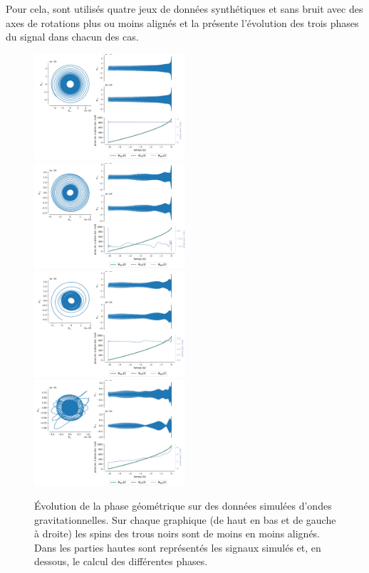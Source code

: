 Pour cela, sont utilisés quatre jeux de données synthétiques et sans bruit avec des axes de rotations plus ou moins alignés et la  présente l’évolution des trois phases du signal dans chacun des cas.
\\
\begin{figure}[h]
	\includegraphics[width=0.5\textwidth]{fig/part-3/GW_plot_1.pdf}\hfill
	\includegraphics[width=0.5\textwidth]{fig/part-3/GW_plot_2.pdf}\\
	\includegraphics[width=0.5\textwidth]{fig/part-3/GW_plot_3.pdf}\hfill
	\includegraphics[width=0.5\textwidth]{fig/part-3/GW_plot_4.pdf}
	\caption[Évolution de la phase géométrique sur des données simulées d'ondes gravitationnelles]{Évolution de la phase géométrique sur des données simulées d'ondes gravitationnelles. Sur chaque graphique (de haut en bas et de gauche à droite) les spins des trous noirs sont de moins en moins alignés. Dans les parties hautes sont représentés les signaux simulés et, en dessous, le calcul des différentes phases.}
	\label{fig:phase_g2GW}
\end{figure}

